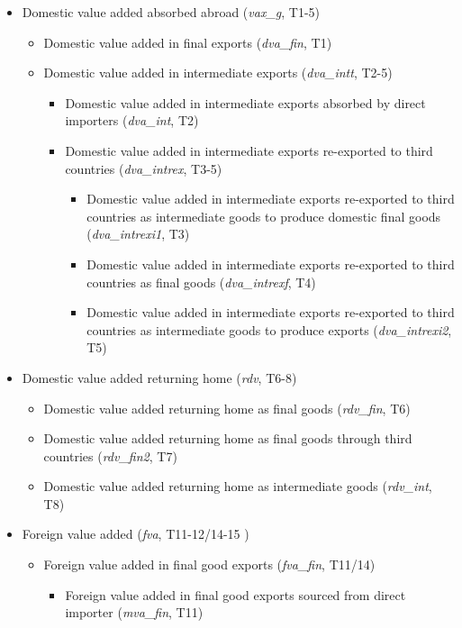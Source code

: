 \documentclass[a4paper,11pt]{article}
\begin{document}
\begin{itemize}
\item Domestic value added absorbed abroad (\textit{vax\_g}, T1-5)
\begin{itemize}
\item Domestic value added in final exports (\textit{dva\_fin}, T1)
\item Domestic value added in intermediate exports (\textit{dva\_intt}, T2-5)
\begin{itemize}
\item Domestic value added in intermediate exports absorbed by direct importers (\textit{dva\_int}, T2)
\item Domestic value added in intermediate exports re-exported to third countries (\textit{dva\_intrex}, T3-5)
\begin{itemize}
\item Domestic value added in intermediate exports re-exported to third countries as intermediate goods to produce domestic final goods (\textit{dva\_intrexi1}, T3)
\item Domestic value added in intermediate exports re-exported to third countries as  final goods (\textit{dva\_intrexf}, T4)
\item Domestic value added in intermediate exports re-exported to third countries as intermediate goods to produce exports (\textit{dva\_intrexi2}, T5)
\end{itemize}
\end{itemize}
\end{itemize}
\item Domestic value added returning home (\textit{rdv}, T6-8)
\begin{itemize}
\item Domestic value added returning home as final goods (\textit{rdv\_fin}, T6)
\item Domestic value added returning home as final goods through third countries (\textit{rdv\_fin2}, T7)
\item Domestic value added returning home as intermediate goods (\textit{rdv\_int}, T8)
\end{itemize}
\item Foreign value added (\textit{fva}, T11-12/14-15 )
\begin{itemize}
\item Foreign value added in final good exports (\textit{fva\_fin}, T11/14)
\begin{itemize}
\item Foreign value added in final good exports sourced from direct importer (\textit{mva\_fin}, T11)

\end{itemize}
\end{itemize}
\end{itemize}
\end{document}
